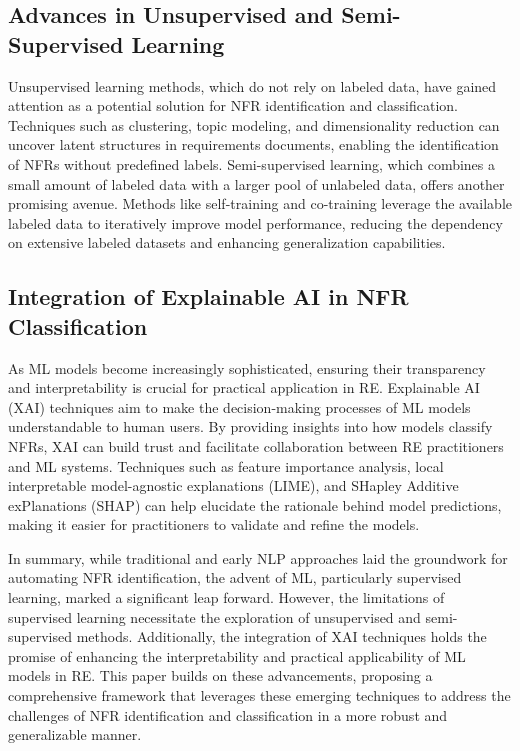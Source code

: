 \documentclass[sigconf,natbib=false]{acmart}
\begin{document}
\subsection{Advances in Unsupervised and Semi-Supervised Learning}
Unsupervised learning methods, which do not rely on labeled data, have gained attention as a potential solution for NFR identification and classification. Techniques such as clustering, topic modeling, and dimensionality reduction can uncover latent structures in requirements documents, enabling the identification of NFRs without predefined labels. Semi-supervised learning, which combines a small amount of labeled data with a larger pool of unlabeled data, offers another promising avenue. Methods like self-training and co-training leverage the available labeled data to iteratively improve model performance, reducing the dependency on extensive labeled datasets and enhancing generalization capabilities.

\subsection{Integration of Explainable AI in NFR Classification}
As ML models become increasingly sophisticated, ensuring their transparency and interpretability is crucial for practical application in RE. Explainable AI (XAI) techniques aim to make the decision-making processes of ML models understandable to human users. By providing insights into how models classify NFRs, XAI can build trust and facilitate collaboration between RE practitioners and ML systems. Techniques such as feature importance analysis, local interpretable model-agnostic explanations (LIME), and SHapley Additive exPlanations (SHAP) can help elucidate the rationale behind model predictions, making it easier for practitioners to validate and refine the models.

In summary, while traditional and early NLP approaches laid the groundwork for automating NFR identification, the advent of ML, particularly supervised learning, marked a significant leap forward. However, the limitations of supervised learning necessitate the exploration of unsupervised and semi-supervised methods. Additionally, the integration of XAI techniques holds the promise of enhancing the interpretability and practical applicability of ML models in RE. This paper builds on these advancements, proposing a comprehensive framework that leverages these emerging techniques to address the challenges of NFR identification and classification in a more robust and generalizable manner.
\end{document}
